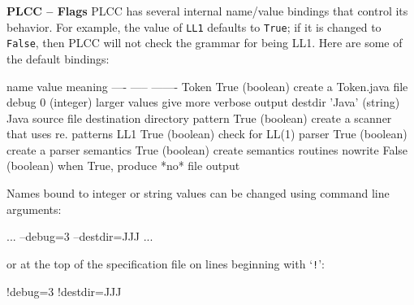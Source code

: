 \begin{minipage}[t]{\sw}
\slidenumber
\LARGE
{\bf PLCC -- Flags}\exx
PLCC has several internal name/value bindings that control its behavior.
For example, the value of \verb'LL1' defaults to \verb'True';
if it is changed to \verb'False',
then PLCC will not check the grammar for being LL1.
Here are some of the default bindings:
{\Large
\begin{qv}
name      value  meaning
----      -----  -------
Token     True   (boolean) create a Token.java file
debug     0      (integer) larger values give more verbose output
destdir   'Java' (string)  Java source file destination directory
pattern   True   (boolean) create a scanner that uses re. patterns
LL1       True   (boolean) check for LL(1)
parser    True   (boolean) create a parser
semantics True   (boolean) create semantics routines
nowrite   False  (boolean) when True, produce *no* file output
\end{qv}
}
Names bound to integer or string values can be changed
using command line arguments:
{\Large
\begin{qv}
... --debug=3 --destdir=JJJ ...
\end{qv}
}
or at the top of the specification file
on lines beginning with `\verb'!'':
{\Large
\begin{qv}
!debug=3
!destdir=JJJ
\end{qv}
}
\end{minipage}
\clearpage
